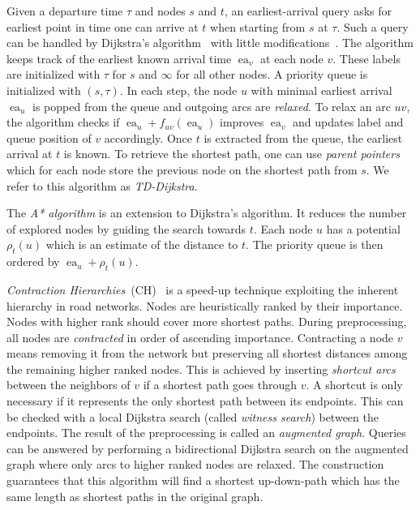 \documentclass[a4paper,UKenglish,cleveref,autoref]{lipics-v2019}
\begin{document}
Given a departure time $\tau$ and nodes $s$ and $t$, an earliest-arrival query asks for earliest point in time one can arrive at $t$ when starting from $s$ at $\tau$.
Such a query can be handled by Dijkstra's algorithm~\cite{d-ntpcg-59} with little modifications~\cite{d-aassp-69}.
The algorithm keeps track of the earliest known arrival time $\operatorname{ea}_v$ at each node $v$.
These labels are initialized with $\tau$ for $s$ and $\infty$ for all other nodes.
A priority queue is initialized with $(s,\tau)$.
In each step, the node $u$ with minimal earliest arrival $\operatorname{ea}_u$ is popped from the queue and outgoing arcs are \emph{relaxed}.
To relax an arc $uv$, the algorithm checks if $\operatorname{ea}_u + f_{uv}(\operatorname{ea}_u)$ improves $\operatorname{ea}_v$ and updates label and queue position of $v$ accordingly.
Once $t$ is extracted from the queue, the earliest arrival at $t$ is known.
To retrieve the shortest path, one can use \emph{parent pointers} which for each node store the previous node on the shortest path from $s$.
We refer to this algorithm as \emph{TD-Dijkstra}.

The \emph{A* algorithm} \cite{hnr-afbhd-68} is an extension to Dijkstra's algorithm.
It reduces the number of explored nodes by guiding the search towards $t$.
Each node $u$ has a potential $\rho_t(u)$ which is an estimate of the distance to $t$.
The priority queue is then ordered by $\operatorname{ea}_u + \rho_t(u)$.

\emph{Contraction Hierarchies}~(CH)~\cite{gssv-erlrn-12} is a speed-up technique exploiting the inherent hierarchy in road networks.
Nodes are heuristically ranked by their importance.
Nodes with higher rank should cover more shortest paths.
During preprocessing, all nodes are \emph{contracted} in order of ascending importance.
Contracting a node $v$ means removing it from the network but preserving all shortest distances among the remaining higher ranked nodes.
This is achieved by inserting \emph{shortcut arcs} between the neighbors of $v$ if a shortest path goes through $v$.
A shortcut is only necessary if it represents the only shortest path between its endpoints.
This can be checked with a local Dijkstra search (called \emph{witness search}) between the endpoints.
The result of the preprocessing is called an \emph{augmented graph}.
Queries can be answered by performing a bidirectional Dijkstra search on the augmented graph where only arcs to higher ranked nodes are relaxed.
The construction guarantees that this algorithm will find a shortest up-down-path which has the same length as shortest paths in the original graph.
\end{document}
